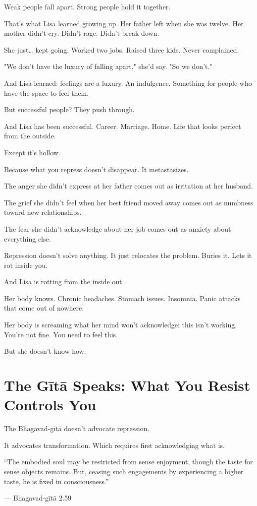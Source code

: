 \documentclass[11pt,twoside]{book}
\begin{document}
Weak people fall apart. Strong people hold it together.

That's what Lisa learned growing up. Her father left when she was twelve. Her mother didn't cry. Didn't rage. Didn't break down.

She just\ldots{} kept going. Worked two jobs. Raised three kids. Never complained.

"We don't have the luxury of falling apart," she'd say. "So we don't."

And Lisa learned: feelings are a luxury. An indulgence. Something for people who have the space to feel them.

But successful people? They push through.

And Lisa has been successful. Career. Marriage. Home. Life that looks perfect from the outside.

Except it's hollow.

Because what you repress doesn't disappear. It metastasizes.

The anger she didn't express at her father comes out as irritation at her husband.

The grief she didn't feel when her best friend moved away comes out as numbness toward new relationships.

The fear she didn't acknowledge about her job comes out as anxiety about everything else.

Repression doesn't solve anything. It just relocates the problem. Buries it. Lets it rot inside you.

And Lisa is rotting from the inside out.

Her body knows. Chronic headaches. Stomach issues. Insomnia. Panic attacks that come out of nowhere.

Her body is screaming what her mind won't acknowledge: this isn't working. You're not fine. You need to feel this.

But she doesn't know how.

\section*{The Gītā Speaks: What You Resist Controls You}

The Bhagavad-gītā doesn't advocate repression.

It advocates transformation. Which requires first acknowledging what is.

\begin{pullquote}
``The embodied soul may be restricted from sense enjoyment, though the taste for sense objects remains. But, ceasing such engagements by experiencing a higher taste, he is fixed in consciousness.''

--- Bhagavad-gītā 2.59
\end{pullquote}
\end{document}
